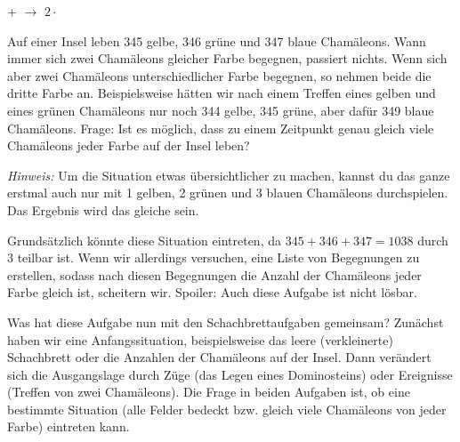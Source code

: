 \documentclass[a4paper,ngerman,12pt]{scrartcl}
\theoremstyle{definition}
\theoremstyle{plain}
\theoremstyle{remark}
\begin{document}
\begin{center}
	 +  $\longrightarrow$ $2 \cdot$ 
\end{center}

Auf einer Insel leben 345 gelbe, 346 grüne und 347 blaue Chamäleons. Wann immer sich zwei Chamäleons gleicher Farbe begegnen, passiert nichts. Wenn sich aber zwei Chamäleons unterschiedlicher Farbe begegnen, so nehmen beide die dritte Farbe an. Beispielsweise hätten wir nach einem Treffen eines gelben und eines grünen Chamäleons nur noch 344 gelbe, 345 grüne, aber dafür 349 blaue Chamäleons. Frage: Ist es möglich, dass zu einem Zeitpunkt genau gleich viele Chamäleons jeder Farbe auf der Insel leben?

\emph{Hinweis:} Um die Situation etwas übersichtlicher zu machen, kannst du das ganze erstmal auch nur mit 1 gelben, 2 grünen und 3 blauen Chamäleons durchspielen. Das Ergebnis wird das gleiche sein.

Grundsätzlich könnte diese Situation eintreten, da $345 + 346 + 347 = 1038$ durch $3$ teilbar ist. Wenn wir allerdings versuchen, eine Liste von Begegnungen zu erstellen, sodass nach diesen Begegnungen die Anzahl der Chamäleons jeder Farbe gleich ist, scheitern wir. Spoiler: Auch diese Aufgabe ist nicht lösbar.

Was hat diese Aufgabe nun mit den Schachbrettaufgaben gemeinsam? Zunächst haben wir eine Anfangssituation, beispielsweise das leere (verkleinerte) Schachbrett oder die Anzahlen der Chamäleons auf der Insel. Dann verändert sich die Ausgangslage durch Züge (das Legen eines Dominosteins) oder Ereignisse (Treffen von zwei Chamäleons). Die Frage in beiden Aufgaben ist, ob eine bestimmte Situation (alle Felder bedeckt bzw. gleich viele Chamäleons von jeder Farbe) eintreten kann.
\end{document}
